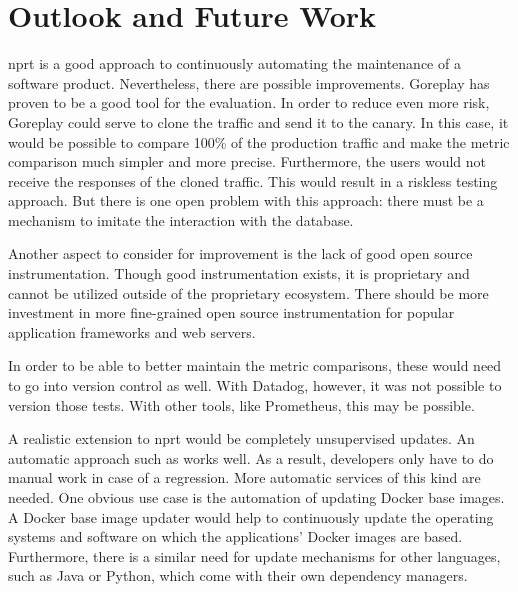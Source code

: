 \section{Outlook and Future Work}

\gls{nprt} is a good approach to continuously automating the maintenance of a software
product. Nevertheless, there are possible improvements. Goreplay has proven to be a good
tool for the evaluation. In order to reduce even more risk, Goreplay could serve to clone
the traffic and send it to the canary. In this case, it would be possible to compare 100\%
of the production traffic and make the metric comparison much simpler and more
precise. Furthermore, the users would not receive the responses of the cloned
traffic. This would result in a riskless testing approach. But there is one open problem
with this approach: there must be a mechanism to imitate the interaction with the
database.

Another aspect to consider for improvement is the lack of good open source
instrumentation. Though good instrumentation exists, it is proprietary and cannot be
utilized outside of the proprietary ecosystem. There should be more investment in more fine-grained open
source instrumentation for popular application frameworks and web servers.

In order to be able to better maintain the metric comparisons, these would need to go into
version control as well. With Datadog, however, it was not possible to version those tests.
With other tools, like Prometheus, this may be possible.

A realistic extension to \gls{nprt} would be completely unsupervised updates. An automatic
approach such as \gemupdater{} works well. As a result, developers only have to do manual
work in case of a regression.  More automatic services of this kind are needed. One
obvious use case is the automation of updating Docker base images. A Docker base image
updater would help to continuously update the operating systems and software on which the
applications' Docker images are based. Furthermore, there is a similar need for update
mechanisms for other languages, such as Java or Python, which come with their own
dependency managers.
